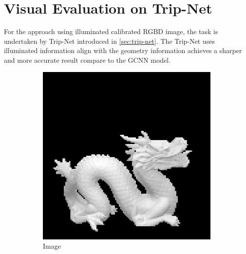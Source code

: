 \newpage 
\section{Visual Evaluation on Trip-Net}

For the approach using illuminated calibrated RGBD image, the task is undertaken by Trip-Net introduced in \ref{sec:trip-net}. The Trip-Net uses illuminated information align with the geometry information achieves a sharper and more accurate result compare to the GCNN model.

\begin{figure}[H]
	\centering
	\begin{subfigure}[b]{0.24\linewidth}
		\includegraphics[width=\linewidth]{./Figures/gcnn_synthetic/fancy_eval_7_img.png}
		\caption{Image}
	\end{subfigure}
	\begin{subfigure}[b]{0.24\linewidth}

\end{subfigure}
\end{figure}
